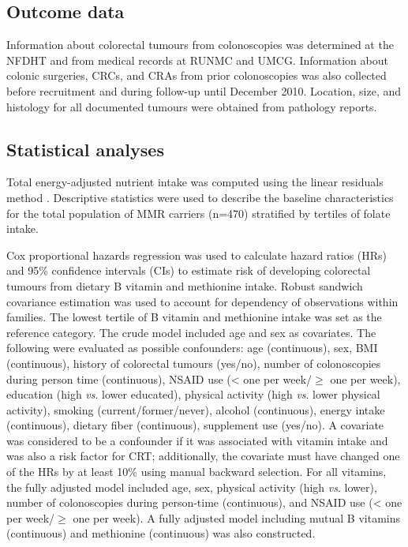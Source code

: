 \subsection{Outcome data} %
\noindent Information about colorectal tumours from colonoscopies was determined at the NFDHT \cite{c632} and from medical records at RUNMC and UMCG. Information about colonic surgeries, CRCs, and CRAs from prior colonoscopies was also collected before recruitment and during follow-up until December 2010. Location, size, and histology for all documented tumours were obtained from pathology reports.

\subsection{Statistical analyses} %
\noindent Total energy-adjusted nutrient intake was computed using the linear residuals method \cite{c633}. Descriptive statistics were used to describe the baseline characteristics for the total population of MMR carriers (n=470) stratified by tertiles of folate intake.

\noindent Cox proportional hazards regression was used to calculate hazard ratios (HRs) and 95\% confidence intervals (CIs) to estimate risk of developing colorectal tumours from dietary B vitamin and methionine intake. Robust sandwich covariance estimation was used to account for dependency of observations within families. The lowest tertile of B vitamin and methionine intake was set as the reference category. The crude model included age and sex as covariates. The following were evaluated as possible confounders: age (continuous), sex, BMI (continuous), history of colorectal tumours (yes/no), number of colonoscopies during person time (continuous), NSAID use (< one per week/$\geq$ one per week), education (high \emph{vs}. lower educated), physical activity (high \emph{vs}. lower physical activity), smoking (current/former/never), alcohol (continuous), energy intake (continuous), dietary fiber (continuous), supplement use (yes/no). A covariate was considered to be a confounder if it was associated with vitamin intake and was also a risk factor for CRT; additionally, the covariate must have changed one of the HRs by at least 10\% using manual backward selection. For all vitamins, the fully adjusted model included age, sex, physical activity (high \emph{vs}. lower), number of colonoscopies during person-time (continuous), and NSAID use (< one per week/$\geq$ one per week). A fully adjusted model including mutual B vitamins (continuous) and methionine (continuous) was also constructed.


